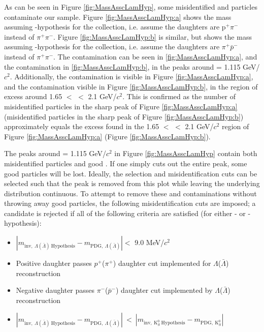 \documentclass[../AnalysisNoteJBuxton.tex]{subfiles}
\begin{document}
As can be seen in Figure \ref{fig:MassAsscLamHyp}, some misidentified \Lam and \ALam particles contaminate our \Ks sample.
Figure \ref{fig:MassAsscLamHyp:a} shows the mass assuming \Lam-hypothesis for the \Ks collection, i.e. assume the daughters are p$^{+}\pi^{-}$ instead of $\pi^{+}\pi^{-}$.
Figure \ref{fig:MassAsscLamHyp:b} is similar, but shows the mass assuming \ALam-hypothesis for the collection, i.e. assume the daughters are $\pi^{+}\bar{p}^{-}$ instead of $\pi^{+}\pi^{-}$.
The \Lam contamination can be seen in \ref{fig:MassAsscLamHyp:a}, and the \ALam contamination in \ref{fig:MassAsscLamHyp:b}, in the peaks around \minv = 1.115 GeV/$c^{2}$.
Additionally, the \ALam contamination is visible in Figure \ref{fig:MassAsscLamHyp:a}, and the \Lam contamination visible in Figure \ref{fig:MassAsscLamHyp:b}, in the region of excess around 1.65 $<$ \minv $<$ 2.1 GeV/$c^{2}$.
This is confirmed as the number of misidentified \Lam particles in the sharp peak of Figure \ref{fig:MassAsscLamHyp:a} (misidentified \ALam particles in the sharp peak of Figure \ref{fig:MassAsscLamHyp:b}) approximately equals the excess found in the 1.65 $<$ \minv $<$ 2.1 GeV/$c^{2}$ region of Figure \ref{fig:MassAsscLamHyp:a} (Figure \ref{fig:MassAsscLamHyp:b}).

The peaks around \minv = 1.115 GeV/$c^{2}$ in Figure \ref{fig:MassAsscLamHyp} contain both misidentified \LamALam particles and good \Ks.
If one simply cuts out the entire peak, some good \Ks particles will be lost.
Ideally, the \Ks selection and \LamALam misidentification cuts can be selected such that the peak is removed from this plot while leaving the underlying distribution continuous.
To attempt to remove these \Lam and \ALam contaminations without throwing away good \Ks particles, the following misidentification cuts are imposed; a \Ks candidate is rejected if all of the following criteria are satisfied (for either \Lam- or \ALam-hypothesis):
\begin{itemize}
 \item $\left|m_{\mathrm{inv}, \ \Lambda(\bar{\Lambda}) \ \mathrm{Hypothesis}} - m_{\mathrm{PDG},\ \Lambda(\bar{\Lambda})}\right| < $ 9.0 MeV/$c^{2}$
 \item Positive daughter passes $p^{+}$($\pi^{+}$) daughter cut implemented for $\Lambda$($\bar{\Lambda}$) reconstruction
 \item Negative daughter passes $\pi^{-}$($\bar{p}^{-}$) daughter cut implemented by $\Lambda$($\bar{\Lambda}$) reconstruction
 \item $\left|m_{\mathrm{inv}, \ \Lambda(\bar{\Lambda}) \ \mathrm{Hypothesis}} - m_{\mathrm{PDG},\ \Lambda(\bar{\Lambda})}\right|~ < ~\left|m_{\mathrm{inv},~ \mathrm{K}^{0}_{S}~ \mathrm{Hypothesis}} - m_{\mathrm{PDG},~ \mathrm{K}^{0}_{S}}\right|$
\end{itemize} 
\end{document}
